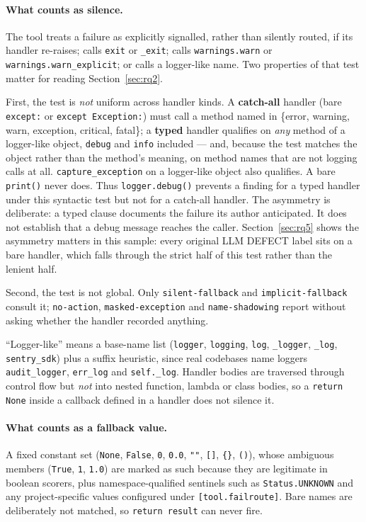 \documentclass[10pt,a4paper]{article}
\begin{document}
\paragraph{What counts as silence.} The tool treats a failure as explicitly
signalled, rather than silently routed, if its handler re-raises; calls
\texttt{exit} or \texttt{\_exit}; calls \texttt{warnings.warn} or
\texttt{warnings.warn\_explicit}; or calls a logger-like name. Two properties of
that test matter for reading Section~\ref{sec:rq2}.

First, the test is \emph{not} uniform across handler kinds. A \textbf{catch-all}
handler (bare \texttt{except:} or \texttt{except Exception:}) must call a method
named in \{error, warning, warn, exception, critical, fatal\}; a \textbf{typed}
handler qualifies on \emph{any} method of a logger-like object, \texttt{debug} and
\texttt{info} included --- and, because the test matches the object rather than the
method's meaning, on method names that are not logging calls at all.
\texttt{capture\_exception} on a logger-like object also qualifies. A bare
\texttt{print()} never does. Thus \texttt{logger.debug()} prevents a finding
for a typed handler under this syntactic test but not for a catch-all handler. The asymmetry is
deliberate: a typed clause documents the failure its author anticipated. It
does not establish that a debug message reaches the caller.
Section~\ref{sec:rq5} shows the asymmetry matters in this sample: every
original LLM DEFECT label sits on a bare handler, which falls through the
strict half of this test rather than the lenient half.

Second, the test is not global. Only \texttt{silent-fallback} and
\texttt{implicit-fallback} consult it; \texttt{no-action},
\texttt{masked-exception} and \texttt{name-shadowing} report without asking whether
the handler recorded anything.

``Logger-like'' means a base-name list
(\texttt{logger}, \texttt{logging}, \texttt{log}, \texttt{\_logger},
\texttt{\_log}, \texttt{sentry\_sdk}) plus a suffix heuristic, since real
codebases name loggers \texttt{audit\_logger}, \texttt{err\_log} and
\texttt{self.\_log}. Handler bodies are traversed through control flow but
\emph{not} into nested function, lambda or class bodies, so a \texttt{return None}
inside a callback defined in a handler does not silence it.

\paragraph{What counts as a fallback value.} A fixed constant set
(\texttt{None}, \texttt{False}, \texttt{0}, \texttt{0.0}, \texttt{""},
\texttt{[]}, \texttt{\{\}}, \texttt{()}), whose ambiguous members
(\texttt{True}, \texttt{1}, \texttt{1.0}) are marked as such because they are
legitimate in boolean scorers, plus namespace-qualified sentinels such as
\texttt{Status.UNKNOWN} and any project-specific values configured under
\texttt{[tool.failroute]}. Bare names are deliberately not matched, so
\texttt{return result} can never fire.
\end{document}
